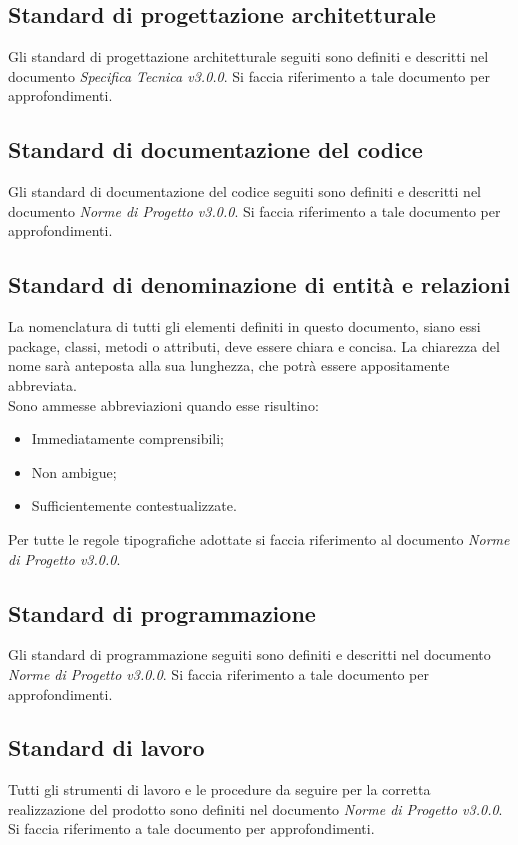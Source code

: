 \subsection{Standard di progettazione architetturale}
Gli standard di progettazione architetturale seguiti sono definiti e descritti nel documento \textit{Specifica Tecnica v3.0.0}. Si faccia riferimento a tale
documento per approfondimenti.
\subsection{Standard di documentazione del codice}
Gli standard di documentazione del codice seguiti sono definiti e descritti nel documento \textit{Norme di Progetto v3.0.0}. Si faccia riferimento a tale
documento per approfondimenti.
\subsection{Standard di denominazione di entità e relazioni}
La nomenclatura di tutti gli elementi definiti in questo documento, siano essi package, classi, metodi o attributi, deve essere chiara e concisa. 
La chiarezza del nome sarà anteposta alla sua lunghezza, che potrà essere appositamente abbreviata. \\
\noindent Sono ammesse abbreviazioni quando esse risultino:
\begin{itemize}
 \item Immediatamente comprensibili;
 \item Non ambigue;
 \item Sufficientemente contestualizzate.
\end{itemize}
Per tutte le regole tipografiche adottate si faccia riferimento al documento \textit{Norme di Progetto v3.0.0}.

\subsection{Standard di programmazione}
Gli standard di programmazione seguiti sono definiti e descritti nel documento \textit{Norme di Progetto v3.0.0}. Si faccia riferimento a tale
documento per approfondimenti.
\subsection{Standard di lavoro}
Tutti gli strumenti di lavoro e le procedure da seguire per la corretta realizzazione del prodotto sono definiti nel documento \textit{Norme di Progetto v3.0.0}.
Si faccia riferimento a tale documento per approfondimenti.



